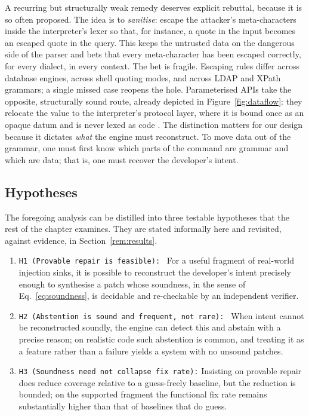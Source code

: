 A recurring but structurally weak remedy deserves explicit rebuttal, because
it is so often proposed. The idea is to \emph{sanitise}: escape the
attacker's meta-characters inside the interpreter's lexer so that, for
instance, a quote in the input becomes an escaped quote in the query. This
keeps the untrusted data on the dangerous side of the parser and bets that
every meta-character has been escaped correctly, for every dialect, in every
context. The bet is fragile. Escaping rules differ across database engines,
across shell quoting modes, and across LDAP and XPath grammars; a single
missed case reopens the hole. Parameterised APIs take the opposite,
structurally sound route, already depicted in Figure~\ref{fig:dataflow}:
they relocate the value to the interpreter's protocol layer, where it is
bound once as an opaque datum and is never lexed as code
\citep{boyd2004sqlrand}. The distinction matters for our design because it
dictates \emph{what} the engine must reconstruct. To move data out of the
grammar, one must first know which parts of the command are grammar and
which are data; that is, one must recover the developer's intent.

\subsection{Hypotheses}
\label{sec:hypotheses}

The foregoing analysis can be distilled into three testable hypotheses that
the rest of the chapter examines. They are stated informally here and
revisited, against evidence, in Section~\ref{rem:results}.
\begin{enumerate}%
  \item \texttt{H1 (Provable repair is feasible): } For a useful fragment of
  real-world injection sinks, it is possible to reconstruct the developer's
  intent precisely enough to synthesise a patch whose soundness, in the
  sense of Eq.~\eqref{eq:soundness}, is decidable and re-checkable by an
  independent verifier.
  \item \texttt{H2 (Abstention is sound and frequent, not rare): } When intent cannot
  be reconstructed soundly, the engine can detect this and abstain with a
  precise reason; on realistic code such abstention is common, and treating
  it as a feature rather than a failure yields a system with no unsound
  patches.
  \item \texttt{H3 (Soundness need not collapse fix rate):} Insisting on provable
  repair does reduce coverage relative to a guess-freely baseline, but the
  reduction is bounded; on the supported fragment the functional fix rate
  remains substantially higher than that of baselines that do guess.
\end{enumerate}

